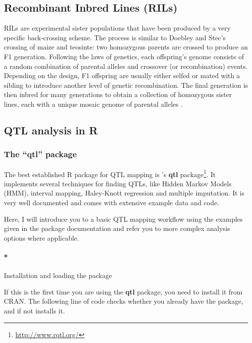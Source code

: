 \documentclass[12pt,]{krantz}
\let\oldparagraph\paragraph
\renewcommand{\paragraph}[1]{\oldparagraph{#1}\mbox{}}
\renewcommand{\href}[2]{#2\footnote{\url{#1}}}
\begin{document}
\subsection{Recombinant Inbred Lines
(RILs)}\label{recombinant-inbred-lines-rils}

RILs are experimental sister populations that have been produced by a
very specific back-crossing scheme. The process is similar to Doebley
and Stec's crossing of maize and teosinte: two homozygous parents are
crossed to produce an F1 generation. Following the laws of genetics,
each offspring's genome consists of a random combination of parental
alleles and crossover (or recombination) events. Depending on the
design, F1 offspring are usually either selfed or mated with a sibling
to introduce another level of genetic recombination. The final
generation is then inbred for many generations to obtain a collection of
homozygous sister lines, each with a unique mosaic genome of parental
alleles \citep{Pollard2012}.

\subsection{QTL analysis in R}\label{qtl-analysis-in-r}

\subsubsection{\texorpdfstring{The ``qtl''
package}{The qtl package}}\label{the-qtl-package}

The best established R package for QTL mapping is \citet{Broman2003}'s
\href{http://www.rqtl.org/}{\textbf{qtl} package}. It implements several
techniques for finding QTLs, like Hidden Markov Models (HMM), interval
mapping, Haley-Knott regression and multiple imputation. It is very well
documented and comes with extensive example data and code.

Here, I will introduce you to a basic QTL mapping workflow using the
examples given in the package documentation and refer you to more
complex analysis options where applicable.

\paragraph*{Installation and loading the
package}\label{installation-and-loading-the-package}

If this is the first time you are using the \textbf{qtl} package, you
need to install it from CRAN. The following line of code checks whether
you already have the package, and if not installs it.
\end{document}
